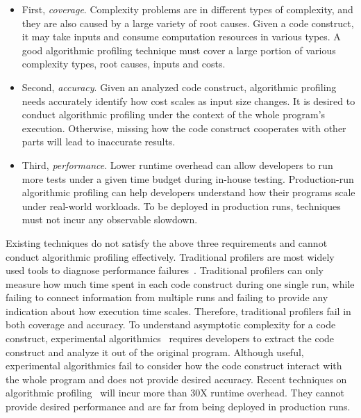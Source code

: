 \begin{itemize}

\item First, \textit{coverage}. Complexity problems are in different types of complexity, 
and they are also caused by a large variety of root causes. 
Given a code construct, it may take inputs and 
consume computation resources in various types.
A good algorithmic profiling technique must cover a 
large portion of various complexity types, root causes, inputs and costs.


\item Second, \textit{accuracy}. 
Given an analyzed code construct,
algorithmic profiling needs accurately identify 
how cost scales as input size changes.
It is desired to conduct algorithmic profiling under the context of the whole program's execution. 
Otherwise, missing how the code construct cooperates with other parts will lead to inaccurate results. 

\item Third, \textit{performance}. 
Lower runtime overhead can allow developers to run more tests 
under a given time budget during in-house testing.
Production-run algorithmic profiling can help developers 
understand how their programs scale
under real-world workloads.
To be deployed in production runs, 
techniques must not incur any observable slowdown.


\end{itemize}

Existing techniques do not satisfy the above three requirements and 
cannot conduct algorithmic profiling effectively. 
Traditional profilers are most widely used tools to 
diagnose performance failures~\cite{gprof,oprofile}. 
Traditional profilers can only measure how much time spent in each code construct during one single run, 
while failing to connect information from multiple runs 
and failing to provide any indication about how execution time scales.
Therefore, traditional profilers fail in both coverage and accuracy.  
To understand asymptotic complexity for a code construct,
experimental algorithmics~\cite{expalg1,expalg2,expalg3} requires developers to 
extract the code construct and analyze it out of the original program. 
Although useful,
experimental algorithmics fail to consider how the code 
construct interact with the whole program and does not provide desired accuracy. 
Recent techniques on algorithmic profiling~\cite{Aprof1,Aprof2,AlgoProf} will incur more than 30X runtime overhead.
They cannot provide desired performance and are far from being deployed in production runs. 


